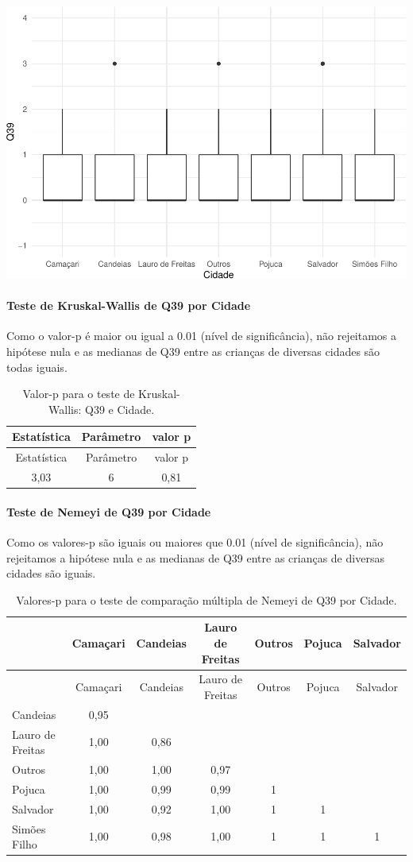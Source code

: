 \documentclass[]{article}
\let\oldparagraph\paragraph
\renewcommand{\paragraph}[1]{\oldparagraph{#1}\mbox{}}
\begin{document}
\begin{center}\includegraphics[width=0.75\linewidth]{relatorio_covid19_files/figure-latex/unnamed-chunk-1493-1} \end{center}

\hypertarget{teste-de-kruskal-wallis-de-q39-por-cidade}{%
\paragraph{Teste de Kruskal-Wallis de Q39 por Cidade}\label{teste-de-kruskal-wallis-de-q39-por-cidade}}

Como o valor-p é maior ou igual a 0.01 (nível de significância), não rejeitamos a hipótese nula e as medianas de Q39 entre as crianças de diversas cidades são todas iguais.

\begin{longtable}[]{@{}ccc@{}}
\caption{\label{tab:unnamed-chunk-1495}Valor-p para o teste de Kruskal-Wallis: Q39 e Cidade.}\tabularnewline
\toprule
Estatística & Parâmetro & valor p\tabularnewline
\midrule
\endfirsthead
\toprule
Estatística & Parâmetro & valor p\tabularnewline
\midrule
\endhead
3,03 & 6 & 0,81\tabularnewline
\bottomrule
\end{longtable}

\hypertarget{teste-de-nemeyi-de-q39-por-cidade}{%
\paragraph{Teste de Nemeyi de Q39 por Cidade}\label{teste-de-nemeyi-de-q39-por-cidade}}

Como os valores-p são iguais ou maiores que 0.01 (nível de significância), não rejeitamos a hipótese nula e as medianas de Q39 entre as crianças de diversas cidades são iguais.

\begin{longtable}[]{@{}lcccccc@{}}
\caption{\label{tab:unnamed-chunk-1497}Valores-p para o teste de comparação múltipla de Nemeyi de Q39 por Cidade.}\tabularnewline
\toprule
& Camaçari & Candeias & Lauro de Freitas & Outros & Pojuca & Salvador\tabularnewline
\midrule
\endfirsthead
\toprule
& Camaçari & Candeias & Lauro de Freitas & Outros & Pojuca & Salvador\tabularnewline
\midrule
\endhead
Candeias & 0,95 & & & & &\tabularnewline
Lauro de Freitas & 1,00 & 0,86 & & & &\tabularnewline
Outros & 1,00 & 1,00 & 0,97 & & &\tabularnewline
Pojuca & 1,00 & 0,99 & 0,99 & 1 & &\tabularnewline
Salvador & 1,00 & 0,92 & 1,00 & 1 & 1 &\tabularnewline
Simões Filho & 1,00 & 0,98 & 1,00 & 1 & 1 & 1\tabularnewline
\bottomrule
\end{longtable}
\end{document}
